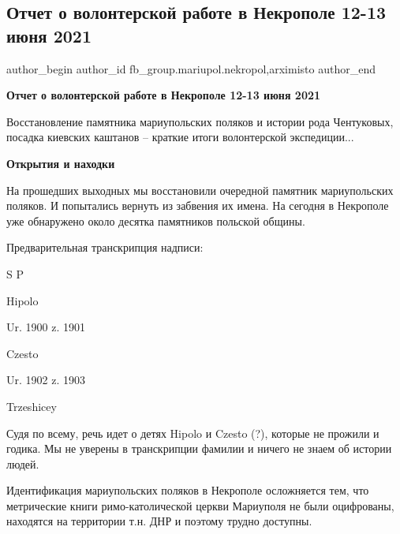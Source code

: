  
 
 
 
 

\subsection{Отчет о волонтерской работе в Некрополе 12-13 июня 2021}
\label{sec:18_06_2021.fb.fb_group.mariupol.nekropol.1.otchet_volonter_rabota_12_13_iunja}
 
\ifcmt
 author_begin
   author_id fb_group.mariupol.nekropol,arximisto
 author_end
\fi

\vspace{0.5cm}
\textbf{Отчет о волонтерской работе в Некрополе 12-13 июня 2021}

Восстановление памятника мариупольских поляков и истории рода Чентуковых,
посадка киевских каштанов – краткие итоги волонтерской экспедиции...

\textbf{Открытия и находки}

На прошедших выходных мы восстановили очередной памятник мариупольских поляков.
И попытались вернуть из забвения их имена. На сегодня в Некрополе уже
обнаружено около десятка памятников польской общины.

Предварительная транскрипция надписи:

S P\par
Hipolo\par
Ur. 1900 z. 1901\par
Czesto\par
Ur. 1902 z. 1903\par
Trzeshicey\par

Судя по всему, речь идет о детях Hipolo и Czesto (?), которые не прожили и
годика. Мы не уверены в транскрипции фамилии и ничего не знаем об истории
людей.

Идентификация мариупольских поляков в Некрополе осложняется тем, что
метрические книги римо-католической церкви Мариуполя не были оцифрованы,
находятся на территории т.н. ДНР и поэтому трудно доступны.

